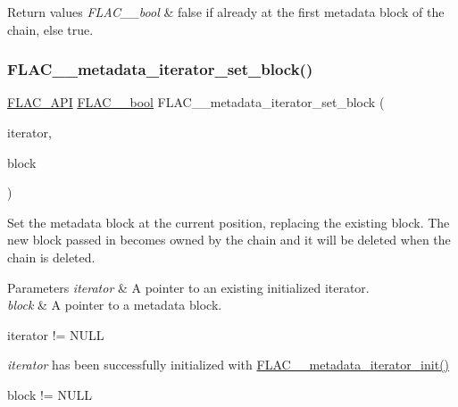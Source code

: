 \begin{DoxyRetVals}{Return values}
{\em F\+L\+A\+C\+\_\+\+\_\+bool} & {\ttfamily false} if already at the first metadata block of the chain, else {\ttfamily true}. \\
\hline
\end{DoxyRetVals}
\mbox{\label{group__flac__metadata__level2_gab40c33a0bf35a2932a5c13f5230e0d9e}} 
\subsubsection{\texorpdfstring{F\+L\+A\+C\+\_\+\+\_\+metadata\+\_\+iterator\+\_\+set\+\_\+block()}{FLAC\_\_metadata\_iterator\_set\_block()}}
{\footnotesize\ttfamily \hyperlink{group__flac__export_ga56ca07df8a23310707732b1c0007d6f5}{F\+L\+A\+C\+\_\+\+A\+PI} \hyperlink{ordinals_8h_a95103469f1cbd78b8cf250194985b34e}{F\+L\+A\+C\+\_\+\+\_\+bool} F\+L\+A\+C\+\_\+\+\_\+metadata\+\_\+iterator\+\_\+set\+\_\+block (\begin{DoxyParamCaption}\item[{\hyperlink{group__flac__metadata__level2_ga9f3e135a07cdef7e51597646aa7b89b2}{F\+L\+A\+C\+\_\+\+\_\+\+Metadata\+\_\+\+Iterator} $\ast$}]{iterator,  }\item[{\hyperlink{struct_f_l_a_c_____stream_metadata}{F\+L\+A\+C\+\_\+\+\_\+\+Stream\+Metadata} $\ast$}]{block }\end{DoxyParamCaption})}

Set the metadata block at the current position, replacing the existing block. The new block passed in becomes owned by the chain and it will be deleted when the chain is deleted.


\begin{DoxyParams}{Parameters}
{\em iterator} & A pointer to an existing initialized iterator. \\
\hline
{\em block} & A pointer to a metadata block.  
\begin{DoxyCode}
iterator != NULL 
\end{DoxyCode}
 {\itshape iterator} has been successfully initialized with \hyperlink{group__flac__metadata__level2_ga4a5af69a1f19436b02f738eb8c97c959}{F\+L\+A\+C\+\_\+\+\_\+metadata\+\_\+iterator\+\_\+init()} 
\begin{DoxyCode}
block != NULL 
\end{DoxyCode}
 \\
\hline
\end{DoxyParams}

